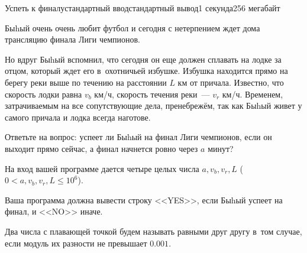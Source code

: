 \begin{problem}{Успеть к финалу}{стандартный ввод}{стандартный вывод}{1 секунда}{256 мегабайт}

Быhый очень очень любит футбол и сегодня с нетерпением ждет дома трансляцию финала Лиги чемпионов. 

Но вдруг Быhый вспомнил, что сегодня он еще должен сплавать на лодке за отцом, который ждет его в~охотничьей избушке. Избушка находится прямо на берегу реки выше по течению на расстоянии $L$ км от причала. Известно, что скорость лодки равна $v_b$ км/ч, скорость течения реки~--- $v_r$ км/ч. Временем, затрачиваемым на все сопутствующие дела, пренебрежём, так как Быhый живет у самого причала и лодка всегда наготове. 

Ответьте на вопрос: успеет ли Быhый на финал Лиги чемпионов, если он выходит прямо сейчас, а финал начнется ровно через $a$ минут?

\InputFile
На вход вашей программе дается четыре целых числа $a, v_b, v_r, L$ ($0 < a, v_b, v_r, L\leq 10^6$).

\OutputFile
Ваша программа должна вывести строку <<YES>>, если Быhый успеет на финал, и <<NO>> иначе.

\Examples

\begin{example}
%
%
\end{example}

\Note
Два числа с плавающей точкой будем называть равными друг другу в~том случае, если модуль их разности не превышает $0.001$.

\end{problem}

